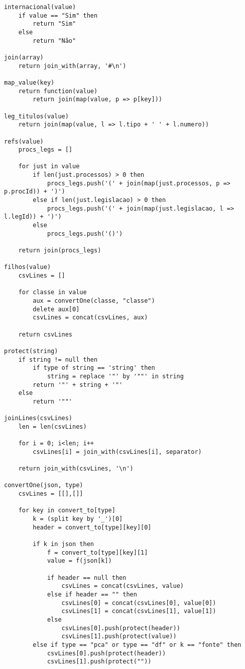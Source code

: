\begin{lstlisting}[language=pseudocode, caption=Algoritmo de conversão de \acrshort{json} para \acrshort{csv}]
internacional(value)
    if value == "Sim" then
        return "Sim"
    else
        return "Não"

join(array)
    return join_with(array, '#\n')

map_value(key)
    return function(value)
        return join(map(value, p => p[key]))

leg_titulos(value)
    return join(map(value, l => l.tipo + ' ' + l.numero))

refs(value)
    procs_legs = []

    for just in value
        if len(just.processos) > 0 then
            procs_legs.push('(' + join(map(just.processos, p => p.procId)) + ')')
        else if len(just.legislacao) > 0 then
            procs_legs.push('(' + join(map(just.legislacao, l => l.legId)) + ')')
        else
            procs_legs.push('()')

    return join(procs_legs)

filhos(value)
    csvLines = []

    for classe in value
        aux = convertOne(classe, "classe")
        delete aux[0]
        csvLines = concat(csvLines, aux)

    return csvLines

protect(string)
    if string != null then
        if type of string == 'string' then
            string = replace '"' by '""' in string
        return '"' + string + '"'
    else
        return '""'

joinLines(csvLines)
    len = len(csvLines)

    for i = 0; i<len; i++
        csvLines[i] = join_with(csvLines[i], separator)

    return join_with(csvLines, '\n')

convertOne(json, type)
    csvLines = [[],[]]

    for key in convert_to[type]
        k = (split key by '_')[0]
        header = convert_to[type][key][0]

        if k in json then
            f = convert_to[type][key][1]
            value = f(json[k])

            if header == null then
                csvLines = concat(csvLines, value)
            else if header == "" then
                csvLines[0] = concat(csvLines[0], value[0])
                csvLines[1] = concat(csvLines[1], value[1])
            else
                csvLines[0].push(protect(header))
                csvLines[1].push(protect(value))
        else if type == "pca" or type == "df" or k == "fonte" then
            csvLines[0].push(protect(header))
            csvLines[1].push(protect(""))


\end{lstlisting}
